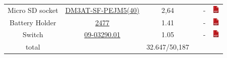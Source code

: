 \documentclass[12pt,a4paper,landscape]{article}
\begin{document}
{\begin{tabular}{|c|c|c|c|c|c|}
					Micro SD socket &
					\href{http://fr.farnell.com/hirose-hrs/dm3at-sf-pejm5-40/connecteur-micro-sd-push-push/dp/1764374}
					{DM3AT-SF-PEJM5(40)} & 2,64 & &
					- &
					\href{http://www.farnell.com/datasheets/1697167.pdf}{\includegraphics[height=1em]{pdf.png}}\\
					    
					Battery Holder &
					\href{http://fr.farnell.com/keystone/2477/battery-holder-pcb/dp/1650684}
					{2477} & 1.41 & &
					- &
					\href{http://www.farnell.com/datasheets/1703957.pdf}{\includegraphics[height=1em]{pdf.png}}\\
					    
					Switch &
					\href{http://fr.farnell.com/eoz/09-03290-01/commutateur-a-glissiere/dp/674345}
					{09-03290.01} & 1.05 & &
					- &
					\href{http://www.farnell.com/datasheets/2010029.pdf}{\includegraphics[height=1em]{pdf.png}}\\
					    
					\hline
					total & & 32.647/50,187 & & &\\
					\hline
				\end{tabular}
			}
\end{document}
